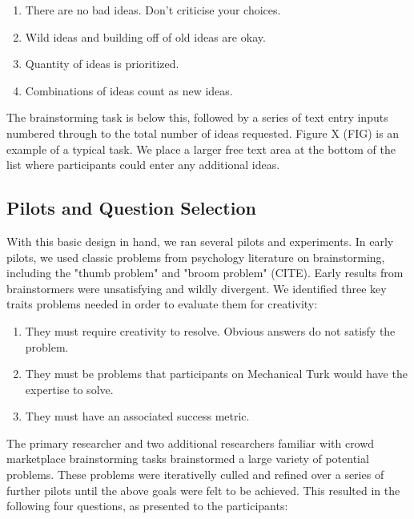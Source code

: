 \begin{enumerate}
\item There are no bad ideas. Don't criticise your choices.
\item Wild ideas and building off of old ideas are okay.
\item Quantity of ideas is prioritized.
\item Combinations of ideas count as new ideas.
\end{enumerate}

The brainstorming task is below this, followed by a series of text entry inputs numbered through to the total number of ideas requested. Figure X (FIG) is an example of a typical task. We place a larger free text area at the bottom of the list where participants could enter any additional ideas.

\subsection{Pilots and Question Selection}

With this basic design in hand, we ran several pilots and experiments. In early pilots, we used classic problems from psychology literature on brainstorming, including the "thumb problem" and "broom problem" (CITE). Early results from brainstormers were unsatisfying and wildly divergent. We identified three key traits problems needed in order to evaluate them for creativity:

\begin{enumerate}
\item They must require creativity to resolve. Obvious answers do not satisfy the problem.
\item They must be problems that participants on Mechanical Turk would have the expertise to solve.
\item They must have an associated success metric.
\end{enumerate}

The primary researcher and two additional researchers familiar with crowd marketplace brainstorming tasks brainstormed a large variety of potential problems. These problems were iterativelly culled and refined over a series of further pilots until the above goals were felt to be achieved. This resulted in the following four questions, as presented to the participants:

